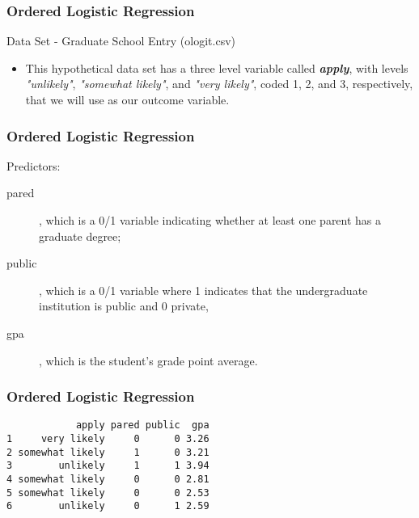 \documentclass[00-GLMregslides.tex]{subfiles}
\begin{document}
\begin{frame}
\frametitle{Ordered Logistic Regression}
\large
Data Set - Graduate School Entry (ologit.csv) \smallskip
\begin{itemize}
\item 
This hypothetical data set has a three level variable called \textbf{\textit{apply}}, with levels \textit{"unlikely"}, \textit{"somewhat likely"}, and \textit{"very likely"}, coded 1, 2, and 3, respectively, 
that we will use as our outcome variable. 
\end{itemize}
\end{frame}
\begin{frame}
\frametitle{Ordered Logistic Regression}
\large
Predictors:
\begin{description}
\item[pared], which is a 0/1 variable indicating whether at least 
one parent has a graduate degree; 
\item[public], which is a 0/1 variable where 1 indicates that the undergraduate institution is public and 0 private, 
\item[gpa], which is 
the student's grade point average. 
\end{description}
\end{frame}
\begin{frame}[fragile]
\frametitle{Ordered Logistic Regression}
\large
\begin{verbatim}
            apply pared public  gpa
1     very likely     0      0 3.26
2 somewhat likely     1      0 3.21
3        unlikely     1      1 3.94
4 somewhat likely     0      0 2.81
5 somewhat likely     0      0 2.53
6        unlikely     0      1 2.59
\end{verbatim}
\end{frame}
\end{document}
